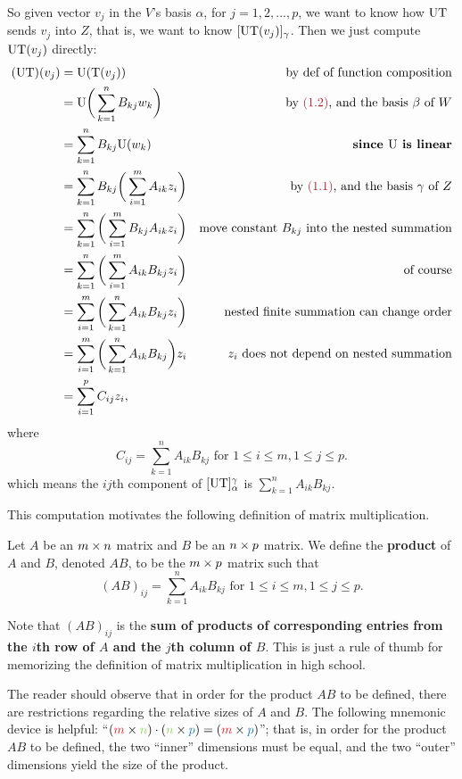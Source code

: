 So given vector \(v_j\) in the \(V\)'s basis \(\alpha\), for \(j = 1, 2, ..., p\), we want to know how \(\mathrm{U}\mathrm{T}\) sends \(v_j\) into \(Z\), that is, we want to know \([\mathrm{U}\mathrm{T}(v_j)]_{\gamma}\).
Then we just compute \(\mathrm{U}\mathrm{T}(v_j)\) directly:
\begin{align*}
    (\U\T)(v_j) & = \U(\T(v_j)) & \text{by def of function composition} \\
                & = \U \bigg( \sum_{k = 1}^{n} B_{kj} w_k \bigg) & \text{by \MAROON{(1.2)}, and the basis \(\beta\) of \(W\)} \\
                & = \sum_{k = 1}^n B_{kj} \U(w_k) & \text{\textbf{since \(\U\) is linear}} \\
                & = \sum_{k = 1}^n B_{kj} \bigg( \sum_{i = 1}^m A_{ik} z_i \bigg) & \text{by \MAROON{(1.1)}, and the basis \(\gamma\) of \(Z\)} \\
                & = \sum_{k = 1}^n \bigg( \sum_{i = 1}^m B_{kj} A_{ik} z_i \bigg) & \text{move constant \(B_{kj}\) into the nested summation} \\
                & = \sum_{k = 1}^n \bigg( \sum_{i = 1}^m A_{ik} B_{kj} z_i \bigg) & \text{of course} \\
                & = \sum_{i = 1}^m \bigg( \sum_{k = 1}^n A_{ik} B_{kj} z_i \bigg) & \text{nested finite summation can change order} \\
                & = \sum_{i = 1}^m \bigg( \sum_{k = 1}^n A_{ik} B_{kj} \bigg) z_i & \text{\(z_i\) does not depend on nested summation} \\
                & = \sum_{i = 1}^p C_{ij} z_i,
\end{align*}
where
\[
    C_{ij} = \sum_{k = 1}^n A_{ik} B_{kj} \text{ for } 1 \le i \le m, 1 \le j \le p.
\]
which means the \(ij\)th component of \([\mathrm{U}\mathrm{T}]_{\alpha}^{\gamma}\) is \(\sum_{k = 1}^n A_{ik} B_{kj}\).

This computation motivates the following definition of matrix multiplication. \begin{definition} \label{def 2.10}
Let \(A\) be an \(m \times n\) matrix and \(B\) be an \(n \times p\) matrix. 
We define the \textbf{product} of \(A\) and \(B\), denoted \(AB\), to be the \(m \times p\) matrix such that
\[
    (AB)_{ij} = \sum_{k = 1}^n A_{ik} B_{kj} \text{ for } 1 \le i \le m, 1 \le j \le p.
\]
\end{definition}

\begin{remark} \label{remark 2.3.2}
Note that \((AB)_{ij}\) is the \textbf{sum of products of corresponding entries from the \(i\)th row of \(A\) and the \(j\)th column of \(B\)}.
This is just a rule of thumb for memorizing the definition of matrix multiplication in high school.

The reader should observe that in order for the product \(AB\) to be defined, there are restrictions regarding the relative sizes of \(A\) and \(B\).
The following mnemonic device is helpful: ``\((\RED{m} \X \GREEN{n}) \cdot (\GREEN{n} \X \BLUE{p}) = (\RED{m} \X \BLUE{p})\)'';
that is, in order for the product \(AB\) to be defined, the two ``inner'' dimensions must be equal, and the two ``outer'' dimensions yield the size of the product.
\end{remark}

